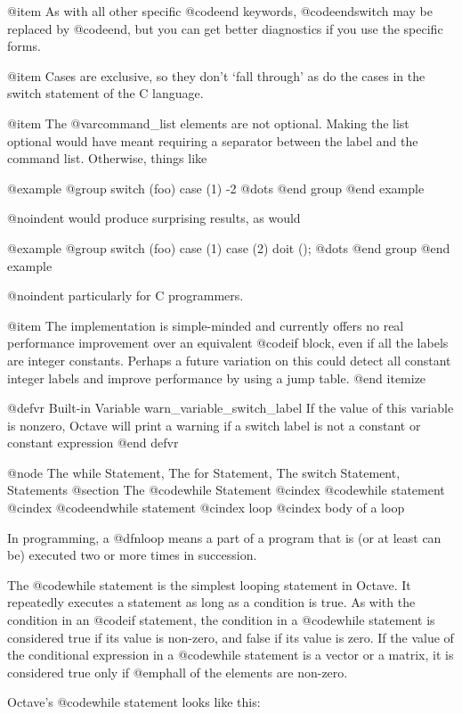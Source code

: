@item
As with all other specific @code{end} keywords, @code{endswitch} may be
replaced by @code{end}, but you can get better diagnostics if you use
the specific forms.

@item
Cases are exclusive, so they don't `fall through' as do the cases
in the switch statement of the C language.

@item
The @var{command_list} elements are not optional.  Making the list
optional would have meant requiring a separator between the label and
the command list.  Otherwise, things like

@example
@group
switch (foo)
  case (1) -2
  @dots{}
@end group
@end example

@noindent
would produce surprising results, as would

@example
@group
switch (foo)
  case (1)
  case (2)
    doit ();
  @dots{}
@end group
@end example

@noindent
particularly for C programmers.

@item
The implementation is simple-minded and currently offers no real
performance improvement over an equivalent @code{if} block, even if all
the labels are integer constants.  Perhaps a future variation on this
could detect all constant integer labels and improve performance by
using a jump table.
@end itemize

@defvr {Built-in Variable} warn_variable_switch_label
If the value of this variable is nonzero, Octave will print a warning if
a switch label is not a constant or constant expression
@end defvr

@node The while Statement, The for Statement, The switch Statement, Statements
@section The @code{while} Statement
@cindex @code{while} statement
@cindex @code{endwhile} statement
@cindex loop
@cindex body of a loop

In programming, a @dfn{loop} means a part of a program that is (or at least can
be) executed two or more times in succession.

The @code{while} statement is the simplest looping statement in Octave.
It repeatedly executes a statement as long as a condition is true.  As
with the condition in an @code{if} statement, the condition in a
@code{while} statement is considered true if its value is non-zero, and
false if its value is zero.  If the value of the conditional expression
in a @code{while} statement is a vector or a matrix, it is considered
true only if @emph{all} of the elements are non-zero.

Octave's @code{while} statement looks like this:


